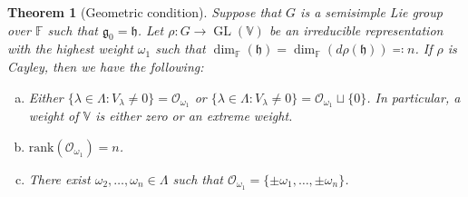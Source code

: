 \documentclass[11pt,reqno]{amsart}
\DeclareMathOperator{\GL}{GL}
\newtheorem{theorem}{Theorem}[section]
\newcommand{\rank}{\mathrm{rank}} %
\newcommand{\FF}{\mathbb{F}} %
\begin{document}
\begin{theorem}[Geometric condition]\label{thm:main}
Suppose that $G$ is a semisimple Lie group over $\mathbb{F}$ such that $\mathfrak{g}_0 = \mathfrak{h}$.  Let $\rho: G \to \GL(\mathbb{V})$ be an  irreducible representation with the highest weight $\omega_1$ such that $\dim_\FF(\mathfrak{h}) = \dim_\FF(d \rho (\mathfrak{h})) \eqqcolon n$.  If $\rho$ is Cayley,  then we have the following: 
\begin{enumerate}[(a)]
\item Either $\{\lambda \in \Lambda:  V_{\lambda} \ne 0 \}= \mathcal{O}_{\omega_1}$ or  $\{\lambda \in \Lambda:  V_{\lambda} \ne 0 \} =  \mathcal{O}_{\omega_1} \sqcup \{0\}$.  In particular,  a weight of $\mathbb{V}$ is either zero or an extreme weight.
\label{thm:main:item1}
\item $\rank ( \mathcal{O}_{\omega_1} ) = n$.  \label{thm:main:item2}
\item There exist $\omega_2,\dots,  \omega_n \in \Lambda$ such that $\mathcal{O}_{\omega_1} = \{ \pm \omega_1,\dots,  \pm \omega_n \}$.  \label{thm:main:item3}
\end{enumerate}
\end{theorem}
\end{document}
